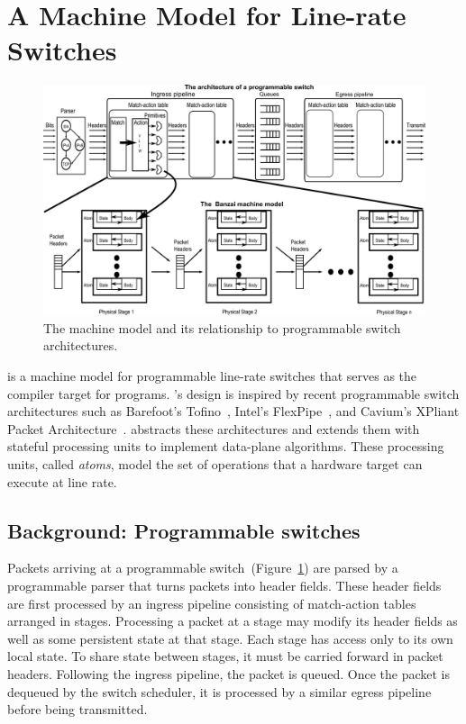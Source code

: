 \section{A Machine Model for Line-rate Switches}
\label{s:absmachine}
\begin{figure}[!t]
  \includegraphics[width=\textwidth]{banzai.pdf}
  \caption{The \absmachine machine model and its relationship to
  programmable switch architectures.}
  \label{fig:switch}
\end{figure}

\absmachine is a machine model for programmable line-rate switches that serves
as the compiler target for \pktlanguage programs.  \absmachine's design is
inspired by recent programmable switch architectures such as Barefoot's
Tofino~\cite{tofino}, Intel's FlexPipe~\cite{flexpipe}, and Cavium's XPliant
Packet Architecture~\cite{xpliant}. \absmachine abstracts these architectures
and extends them with stateful processing units to implement data-plane
algorithms. These processing units, called {\em atoms}, model the set of
operations that a hardware target can execute at line rate.

\subsection{Background: Programmable switches}
Packets arriving at a programmable switch~(Figure~\ref{fig:switch}) are parsed
by a programmable parser that turns packets into header fields. These header
fields are first processed by an ingress pipeline consisting of match-action
tables arranged in stages. Processing a packet at a stage may modify its header
fields as well as some persistent state at that stage. Each stage has access
only to its own local state. To share state between stages, it must be carried
forward in packet headers. Following the ingress pipeline, the packet is
queued. Once the packet is dequeued by the switch scheduler, it is processed by
a similar egress pipeline before being transmitted.

